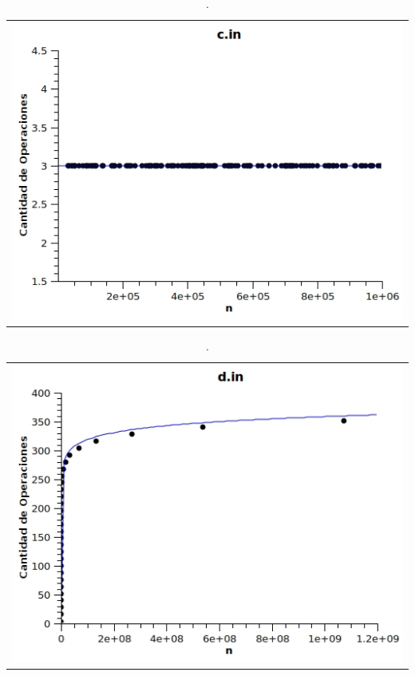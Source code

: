 	\begin{table}[ht]
		\centering 
			\begin{tabular}{c}
				\includegraphics[scale = 0.8]{./../ej1/tests/c.jpg}
			\end{tabular}
			\caption{.} 
	\end{table}

	\begin{table}[ht]
		\centering 
			\begin{tabular}{c}
				\includegraphics[scale = 0.8]{./../ej1/tests/d.jpg}
			\end{tabular}
			\caption{.} 
	\end{table}

